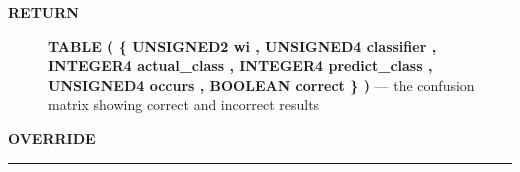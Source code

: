 \par
\begin{description}
\item [\colorbox{tagtype}{\color{white} \textbf{\textsf{RETURN}}}] \textbf{TABLE ( \{ UNSIGNED2 wi , UNSIGNED4 classifier , INTEGER4 actual\_class , INTEGER4 predict\_class , UNSIGNED4 occurs , BOOLEAN correct \} )} --- the confusion matrix showing correct and incorrect results
\end{description}






\par
\begin{description}
\item [\colorbox{tagtype}{\color{white} \textbf{\textsf{OVERRIDE}}}] 
\end{description}



\rule{\linewidth}{0.5pt}


